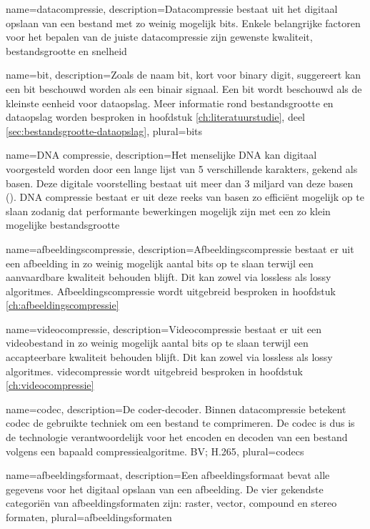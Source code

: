{
	name={datacompressie},
	description={Datacompressie bestaat uit het digitaal opslaan van een bestand met zo weinig mogelijk bits. Enkele belangrijke factoren voor het bepalen van de juiste datacompressie zijn gewenste kwaliteit, bestandsgrootte en snelheid}
}

{
	name={bit},
	description={Zoals de naam bit, kort voor binary digit, suggereert kan een bit beschouwd worden als een binair signaal. Een bit wordt beschouwd als de kleinste eenheid voor dataopslag. Meer informatie rond bestandsgrootte en dataopslag worden besproken in hoofdstuk \ref{ch:literatuurstudie}, deel \ref{sec:bestandsgrootte-dataopslag}},
	plural={bits}
}

{
	name={DNA compressie},
	description={Het menselijke DNA kan digitaal voorgesteld worden door een lange lijst van 5 verschillende karakters, gekend als basen. Deze digitale voorstelling bestaat uit meer dan 3 miljard van deze basen (\cite{dodanaugent2011}). DNA compressie bestaat er uit deze reeks van basen zo efficiënt mogelijk op te slaan zodanig dat performante bewerkingen mogelijk zijn met een zo klein mogelijke bestandsgrootte}
}

{
	name={afbeeldingscompressie},
	description={Afbeeldingscompressie bestaat er uit een afbeelding in zo weinig mogelijk aantal bits op te slaan terwijl een aanvaardbare kwaliteit behouden blijft. Dit kan zowel via lossless als lossy algoritmes. Afbeeldingscompressie wordt uitgebreid besproken in hoofdstuk \ref{ch:afbeeldingscompressie}}
}

{
	name={videocompressie},
	description={Videocompressie bestaat er uit een videobestand in zo weinig mogelijk aantal bits op te slaan terwijl een accapteerbare kwaliteit behouden blijft. Dit kan zowel via lossless als lossy algoritmes. videcompressie wordt uitgebreid besproken in hoofdstuk \ref{ch:videocompressie}}
}

{
	name={codec},
	description={De coder-decoder. Binnen datacompressie betekent codec de gebruikte techniek om een bestand te comprimeren. De codec is dus is de technologie verantwoordelijk voor het encoden en decoden van een bestand volgens een bapaald compressiealgoritme. BV; H.265},
	plural={codecs}
}

{
	name={afbeeldingsformaat},
	description={Een afbeeldingsformaat bevat alle gegevens voor het digitaal opslaan van een afbeelding. De vier gekendste categoriën van afbeeldingsformaten zijn: raster, vector, compound en stereo formaten},
	plural={afbeeldingsformaten}
}

